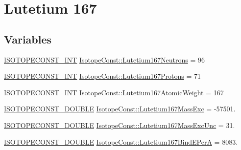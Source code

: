 \hypertarget{group___isotope_const-_lutetium-_lu167}{}\section{Lutetium 167}
\label{group___isotope_const-_lutetium-_lu167}
\subsection*{Variables}
\begin{DoxyCompactItemize}
\item 
\mbox{\hyperlink{group___isotope_const-_macros_ga5f18360b3e99483a35c32d789e62621c}{I\+S\+O\+T\+O\+P\+E\+C\+O\+N\+S\+T\+\_\+\+I\+NT}} \mbox{\hyperlink{group___isotope_const-_lutetium-_lu167_gae4854f05e41f0f6944b5cc45bc0a2991}{Isotope\+Const\+::\+Lutetium167\+Neutrons}} = 96
\item 
\mbox{\hyperlink{group___isotope_const-_macros_ga5f18360b3e99483a35c32d789e62621c}{I\+S\+O\+T\+O\+P\+E\+C\+O\+N\+S\+T\+\_\+\+I\+NT}} \mbox{\hyperlink{group___isotope_const-_lutetium-_lu167_gae8925895cb19bae70d1c33a06c7b356a}{Isotope\+Const\+::\+Lutetium167\+Protons}} = 71
\item 
\mbox{\hyperlink{group___isotope_const-_macros_ga5f18360b3e99483a35c32d789e62621c}{I\+S\+O\+T\+O\+P\+E\+C\+O\+N\+S\+T\+\_\+\+I\+NT}} \mbox{\hyperlink{group___isotope_const-_lutetium-_lu167_gadc09ea17e961cd4f91ee1577e24a39ed}{Isotope\+Const\+::\+Lutetium167\+Atomic\+Weight}} = 167
\item 
\mbox{\hyperlink{group___isotope_const-_macros_ga8f45a7272ce02c0b4c65c44636ed719a}{I\+S\+O\+T\+O\+P\+E\+C\+O\+N\+S\+T\+\_\+\+D\+O\+U\+B\+LE}} \mbox{\hyperlink{group___isotope_const-_lutetium-_lu167_ga5fcd70b73b834cfd3b8e0883843689f7}{Isotope\+Const\+::\+Lutetium167\+Mass\+Exc}} = -\/57501.
\item 
\mbox{\hyperlink{group___isotope_const-_macros_ga8f45a7272ce02c0b4c65c44636ed719a}{I\+S\+O\+T\+O\+P\+E\+C\+O\+N\+S\+T\+\_\+\+D\+O\+U\+B\+LE}} \mbox{\hyperlink{group___isotope_const-_lutetium-_lu167_gae7df529eac248dce516efe149c26f086}{Isotope\+Const\+::\+Lutetium167\+Mass\+Exc\+Unc}} = 31.
\item 
\mbox{\hyperlink{group___isotope_const-_macros_ga8f45a7272ce02c0b4c65c44636ed719a}{I\+S\+O\+T\+O\+P\+E\+C\+O\+N\+S\+T\+\_\+\+D\+O\+U\+B\+LE}} \mbox{\hyperlink{group___isotope_const-_lutetium-_lu167_gaec570eeb67439dc0d04352040efe836f}{Isotope\+Const\+::\+Lutetium167\+Bind\+E\+PerA}} = 8083.
\item 

\end{DoxyCompactItemize}

